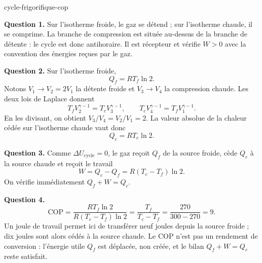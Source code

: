 \begin{exo}{cycle-frigorifique-cop}
\begin{solution}
\textbf{Question 1.} Sur l'isotherme froide, le gaz se détend ; sur l'isotherme chaude, il se comprime. La branche de compression est située au-dessus de la branche de détente : le cycle est donc antihoraire. Il est récepteur et vérifie $W>0$ avec la convention des énergies reçues par le gaz.

\textbf{Question 2.} Sur l'isotherme froide,
\[
Q_f=RT_f\ln2.
\]
Notons $V_1\to V_2=2V_1$ la détente froide et $V_3\to V_4$ la compression chaude. Les deux lois de Laplace donnent
\[
T_fV_2^{\gamma-1}=T_cV_3^{\gamma-1},
\qquad
T_cV_4^{\gamma-1}=T_fV_1^{\gamma-1}.
\]
En les divisant, on obtient $V_3/V_4=V_2/V_1=2$. La valeur absolue de la chaleur cédée sur l'isotherme chaude vaut donc
\[
Q_c=RT_c\ln2.
\]

\textbf{Question 3.} Comme $\Delta U_{\mathrm{cycle}}=0$, le gaz reçoit $Q_f$ de la source froide, cède $Q_c$ à la source chaude et reçoit le travail
\[
W=Q_c-Q_f=R(T_c-T_f)\ln2.
\]
On vérifie immédiatement $Q_f+W=Q_c$.

\textbf{Question 4.}
\[
\mathrm{COP}=\frac{RT_f\ln2}{R(T_c-T_f)\ln2}
=\frac{T_f}{T_c-T_f}
=\frac{270}{300-270}=9.
\]
Un joule de travail permet ici de transférer neuf joules depuis la source froide ; dix joules sont alors cédés à la source chaude. Le COP n'est pas un rendement de conversion : l'énergie utile $Q_f$ est déplacée, non créée, et le bilan $Q_f+W=Q_c$ reste satisfait.
\end{solution}
\end{exo}

